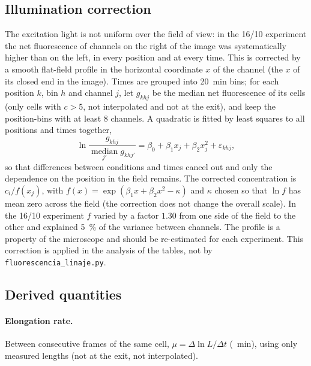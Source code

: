 \documentclass[11pt,a4paper]{article}
\begin{document}
\subsection{Illumination correction}
The excitation light is not uniform over the field of view: in the 16/10 experiment the net fluorescence of channels on the right of the image was systematically higher than on the left, in every position and at every time. This is corrected by a smooth flat-field profile in the horizontal coordinate $x$ of the channel (the $x$ of its closed end in the image). Times are grouped into \SI{20}{\minute} bins; for each position $k$, bin $h$ and channel $j$, let $g_{khj}$ be the median net fluorescence of its cells (only cells with $c>5$, not interpolated and not at the exit), and keep the position-bins with at least 8 channels. A quadratic is fitted by least squares to all positions and times together,
\begin{equation}
\ln\frac{g_{khj}}{\operatorname*{median}_{j'}g_{khj'}}=\beta_0+\beta_1x_j+\beta_2x_j^2+\varepsilon_{khj},
\end{equation}
so that differences between conditions and times cancel out and only the dependence on the position in the field remains. The corrected concentration is $c_i/f(x_j)$, with $f(x)=\exp(\beta_1x+\beta_2x^2-\kappa)$ and $\kappa$ chosen so that $\ln f$ has mean zero across the field (the correction does not change the overall scale). In the 16/10 experiment $f$ varied by a factor $1.30$ from one side of the field to the other and explained \SI{5}{\percent} of the variance between channels. The profile is a property of the microscope and should be re-estimated for each experiment. This correction is applied in the analysis of the tables, not by \texttt{fluorescencia\_linaje.py}.

\subsection{Derived quantities}
\paragraph{Elongation rate.} Between consecutive frames of the same cell, $\mu=\Delta\ln L/\Delta t$ (\si{\per\minute}), using only measured lengths (not at the exit, not interpolated).
\end{document}
